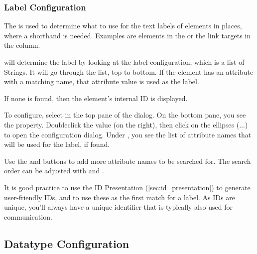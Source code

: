 \subsubsection{Label Configuration}

The  is used to determine what to use for the text labels of elements
in places, where a shorthand is needed.  Examples are elements in the  or the link targets in the  column.

\pror{} will determine the label by looking at the label configuration, which is a list of Strings.
It will go through the list, top to bottom.  If the element has an attribute with a matching name,
that attribute value is used as the label.

If none is found, then the element's internal ID is displayed.

To configure, select  in the top pane of the dialog.  On the bottom pane,
you see the  property.  Doubleclick the value (on the right), then click on the
ellipses (...) to open the configuration dialog.  Under , you see the list of attribute
names that will be used for the label, if found.

Use the  and  buttons to add more attribute names to be searched for.  The
search order can be adjusted with  and .

\begin{info}
It is good practice to use the ID Presentation (\ref{sec:id_presentation}) to generate
user-friendly IDs, and to use these as the first match for a label.  As IDs are unique, you'll always
have a unique identifier that is typically also used for communication.
\end{info}

\subsection{Datatype Configuration}
\label{sec:datatype_configuration}


